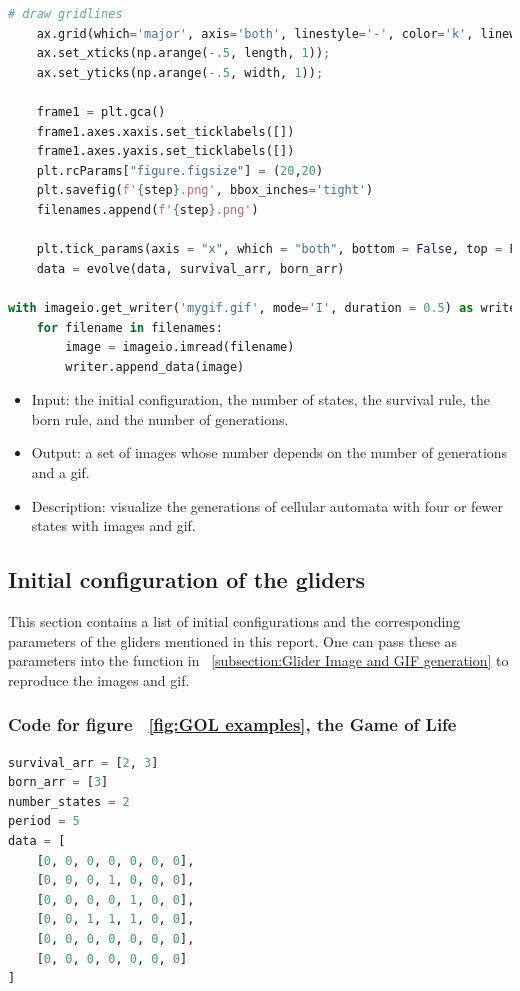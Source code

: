 \documentclass[12pt]{article}
\numberwithin{figure}{section} %
\begin{document}
\begin{lstlisting}[language = Python]
    # draw gridlines
    ax.grid(which='major', axis='both', linestyle='-', color='k', linewidth=2)
    ax.set_xticks(np.arange(-.5, length, 1));
    ax.set_yticks(np.arange(-.5, width, 1));

    frame1 = plt.gca()
    frame1.axes.xaxis.set_ticklabels([])
    frame1.axes.yaxis.set_ticklabels([])
    plt.rcParams["figure.figsize"] = (20,20)
    plt.savefig(f'{step}.png', bbox_inches='tight')
    filenames.append(f'{step}.png')
    
    plt.tick_params(axis = "x", which = "both", bottom = False, top = False)
    data = evolve(data, survival_arr, born_arr)

with imageio.get_writer('mygif.gif', mode='I', duration = 0.5) as writer:
    for filename in filenames:
        image = imageio.imread(filename)
        writer.append_data(image)
\end{lstlisting}
\vspace{-1.5em}
\begin{itemize}[leftmargin = 0.5cm, topsep=0pt,itemsep=-1ex,partopsep=1ex,parsep=1ex]
\item Input: the initial configuration, the number of states, the survival rule, the born rule, and the number of generations. 
\item Output: a set of images whose number depends on the number of generations and a gif. 
\item Description: visualize the generations of cellular automata with four or fewer states with images and gif. 
\end{itemize}

\subsection{Initial configuration of the gliders}
\label{subsection:Initial configuration of the gliders}
This section contains a list of initial configurations and the corresponding parameters of the gliders mentioned in this report. One can pass these as parameters into the function in ~\ref{subsection:Glider Image and GIF generation} to reproduce the images and gif. 

\subsubsection{Code for figure ~\ref{fig:GOL examples}, the Game of Life}
\label{subsubsection:GOL}
\begin{lstlisting}[language = Python]
survival_arr = [2, 3]
born_arr = [3]
number_states = 2
period = 5
data = [
    [0, 0, 0, 0, 0, 0, 0],
    [0, 0, 0, 1, 0, 0, 0],
    [0, 0, 0, 0, 1, 0, 0],
    [0, 0, 1, 1, 1, 0, 0],
    [0, 0, 0, 0, 0, 0, 0],
    [0, 0, 0, 0, 0, 0, 0]   
]
\end{lstlisting}
\end{document}
